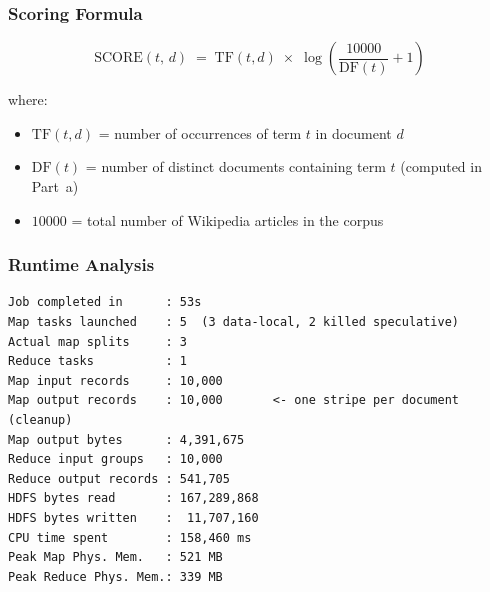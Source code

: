 \documentclass[12pt,a4paper]{article}
\begin{document}
\subsubsection{Scoring Formula}

\begin{equation}
    \text{SCORE}(t,\, d)
    \;=\;
    \text{TF}(t, d)
    \;\times\;
    \log\!\left(\frac{10000}{\text{DF}(t)} + 1\right)
\end{equation}

\noindent where:
\begin{itemize}[leftmargin=1.4em]
    \item $\text{TF}(t, d)$ = number of occurrences of term $t$ in document $d$
    \item $\text{DF}(t)$ = number of distinct documents containing term $t$
    (computed in Part~a)
    \item $10000$ = total number of Wikipedia articles in the corpus
\end{itemize}

\subsubsection{Runtime Analysis}

\begin{lstlisting}[style=shellstyle]
Job completed in      : 53s
Map tasks launched    : 5  (3 data-local, 2 killed speculative)
Actual map splits     : 3
Reduce tasks          : 1
Map input records     : 10,000
Map output records    : 10,000       <- one stripe per document (cleanup)
Map output bytes      : 4,391,675
Reduce input groups   : 10,000
Reduce output records : 541,705
HDFS bytes read       : 167,289,868
HDFS bytes written    :  11,707,160
CPU time spent        : 158,460 ms
Peak Map Phys. Mem.   : 521 MB
Peak Reduce Phys. Mem.: 339 MB
\end{lstlisting}
\end{document}
